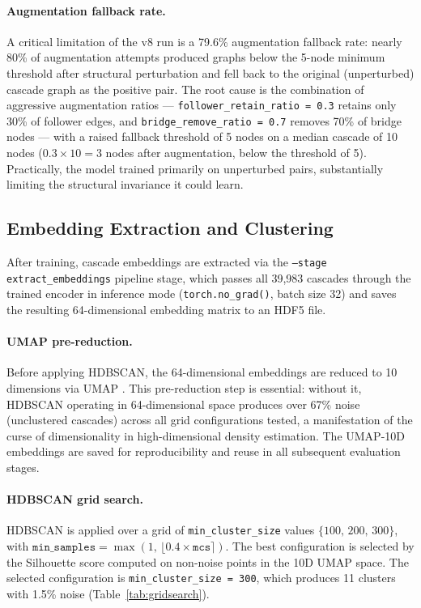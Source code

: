 \documentclass[12pt, a4paper]{article}
\begin{document}
\paragraph{Augmentation fallback rate.} A critical limitation of the v8 run is a 79.6\% augmentation fallback rate: nearly 80\% of augmentation attempts produced graphs below the 5-node minimum threshold after structural perturbation and fell back to the original (unperturbed) cascade graph as the positive pair. The root cause is the combination of aggressive augmentation ratios --- \texttt{follower\_retain\_ratio\,=\,0.3} retains only 30\% of follower edges, and \texttt{bridge\_remove\_ratio\,=\,0.7} removes 70\% of bridge nodes --- with a raised fallback threshold of 5 nodes on a median cascade of 10 nodes ($0.3 \times 10 = 3$ nodes after augmentation, below the threshold of 5). Practically, the model trained primarily on unperturbed pairs, substantially limiting the structural invariance it could learn.

\subsection{Embedding Extraction and Clustering}
\label{sec:clustering}

After training, cascade embeddings are extracted via the \texttt{--stage extract\_embeddings} pipeline stage, which passes all 39,983 cascades through the trained encoder in inference mode (\texttt{torch.no\_grad()}, batch size 32) and saves the resulting 64-dimensional embedding matrix to an HDF5 file.

\paragraph{UMAP pre-reduction.} Before applying HDBSCAN, the 64-dimensional embeddings are reduced to 10 dimensions via UMAP \citep{mcinnes2018umap}. This pre-reduction step is essential: without it, HDBSCAN operating in 64-dimensional space produces over 67\% noise (unclustered cascades) across all grid configurations tested, a manifestation of the curse of dimensionality in high-dimensional density estimation. The UMAP-10D embeddings are saved for reproducibility and reuse in all subsequent evaluation stages.

\paragraph{HDBSCAN grid search.} HDBSCAN is applied over a grid of \texttt{min\_cluster\_size} values $\{100,\,200,\,300\}$, with $\texttt{min\_samples} = \max(1,\, \lfloor 0.4 \times \texttt{mcs} \rceil)$. The best configuration is selected by the Silhouette score computed on non-noise points in the 10D UMAP space. The selected configuration is \texttt{min\_cluster\_size\,=\,300}, which produces 11 clusters with 1.5\% noise (Table~\ref{tab:gridsearch}).
\end{document}
